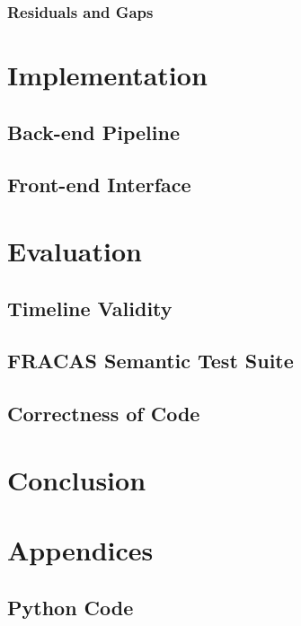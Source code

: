 \documentclass[a4paper,12pt,leqno]{article}
\begin{document}
\subsubsection{Residuals and Gaps}\label{ssub:residuals}

\newpage
\section{Implementation}\label{sec:implementation}
\subsection{Back-end Pipeline}\label{sub:backend} %
\subsection{Front-end Interface}\label{sub:frontend}

\newpage
\section{Evaluation}\label{sec:evaluation}
\subsection{Timeline Validity}\label{sub:validity}
\subsection{FRACAS Semantic Test Suite}\label{sub:fracas}
\subsection{Correctness of Code}\label{sub:correct}
\newpage
\section{Conclusion}\label{sec:conclusion}


\newpage
\pagestyle{empty}
\onehalfspacing


\newpage
\section*{Appendices}
\subsection*{Python Code}
\end{document}
